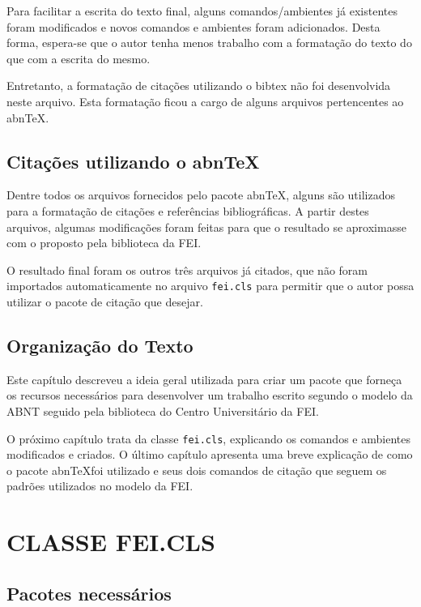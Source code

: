 \documentclass{fei}
\begin{document}
Para facilitar a escrita do texto final, alguns comandos/ambientes já existentes foram modificados e novos comandos e ambientes foram adicionados. Desta forma, espera-se que o autor tenha menos trabalho com a formatação do texto do que com a escrita do mesmo.

Entretanto, a formatação de citações utilizando o bibtex não foi desenvolvida neste arquivo. Esta formatação ficou a cargo de alguns arquivos pertencentes ao abn\TeX.

\section{Citações utilizando o abn\TeX}

Dentre todos os arquivos fornecidos pelo pacote abn\TeX, alguns são utilizados para a formatação de citações e referências bibliográficas. A partir destes arquivos, algumas modificações foram feitas para que o resultado se aproximasse com o proposto pela biblioteca da FEI.

O resultado final foram os outros três arquivos já citados, que não foram importados automaticamente no arquivo \texttt{fei.cls} para permitir que o autor possa utilizar o pacote de citação que desejar.

\section{Organização do Texto}

Este capítulo descreveu a ideia geral utilizada para criar um pacote que forneça os recursos necessários para desenvolver um trabalho escrito segundo o modelo da ABNT seguido pela biblioteca do Centro Universitário da FEI.

O próximo capítulo trata da classe \texttt{fei.cls}, explicando os comandos e ambientes modificados e criados. O último capítulo apresenta uma breve explicação de como o pacote abn\TeX foi utilizado e seus dois comandos de citação que seguem os padrões utilizados no modelo da FEI.

\chapter{CLASSE FEI.CLS}\label{chap:classe}

\section{Pacotes necessários}\label{sec:pacotes}
    
\end{document}
